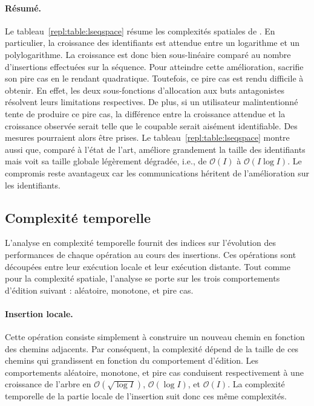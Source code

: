 \paragraph{Résumé.} Le tableau~\ref{repl:table:lseqspace} résume les complexités
spatiales de \LSEQ. En particulier, la croissance des identifiants est attendue
entre un logarithme et un polylogarithme. La croissance est donc bien
sous-linéaire comparé au nombre d'insertions effectuées sur la séquence. Pour
atteindre cette amélioration, \LSEQ sacrifie son pire cas en le rendant
quadratique. Toutefois, ce pire cas est rendu difficile à obtenir. En effet, les
deux sous-fonctions d'allocation aux buts antagonistes résolvent leurs
limitations respectives. De plus, si un utilisateur malintentionné tente de
produire ce pire cas, la différence entre la croissance attendue et la
croissance observée serait telle que le coupable serait aisément
identifiable. Des mesures pourraient alors être prises. Le
tableau~\ref{repl:table:lseqspace} montre aussi que, comparé à l'état de l'art,
\LSEQ améliore grandement la taille des identifiants mais voit sa taille globale
légèrement dégradée, i.e., de $\mathcal{O}(I)$ à $\mathcal{O}(I\log I)$. Le
compromis reste avantageux car les communications héritent de l'amélioration sur
les identifiants.

\subsection{Complexité temporelle}

L'analyse en complexité temporelle fournit des indices sur l'évolution des
performances de chaque opération au cours des insertions. Ces opérations sont
découpées entre leur exécution locale et leur exécution distante. Tout comme
pour la complexité spatiale, l'analyse se porte sur les trois comportements
d'édition suivant : aléatoire, monotone, et pire cas.

\paragraph{Insertion locale.} Cette opération consiste simplement à construire
un nouveau chemin en fonction des chemins adjacents. Par conséquent, la
complexité dépend de la taille de ces chemins qui grandissent en fonction du
comportement d'édition. Les comportements aléatoire, monotone, et pire cas
conduisent respectivement à une croissance de l'arbre en
$\mathcal{O}(\sqrt{\log I})$, $\mathcal{O}(\log I)$, et $\mathcal{O}(I)$. La
complexité temporelle de la partie locale de l'insertion suit donc ces
même complexités.


